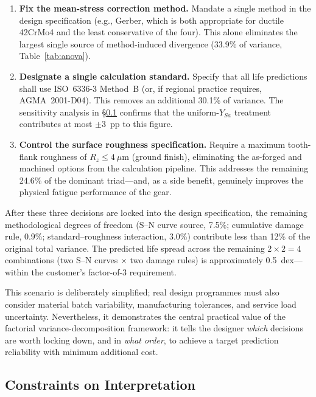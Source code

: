 \documentclass[12pt,a4paper]{article}
\begin{document}
\begin{enumerate}
  \item \textbf{Fix the mean-stress correction method.} Mandate a single
        method in the design specification (e.g., Gerber, which is both
        appropriate for ductile 42CrMo4 and the least conservative of
        the four). This alone eliminates the largest single source of
        method-induced divergence (33.9\% of variance, Table~\ref{tab:anova}).
  \item \textbf{Designate a single calculation standard.} Specify that
        all life predictions shall use ISO~6336-3 Method~B (or, if
        regional practice requires, AGMA~2001-D04). This removes an
        additional 30.1\% of variance. The sensitivity analysis in
        \S\ref{sec:constraints} confirms that the uniform-$Y_{Sa}$
        treatment contributes at most $\pm$3~pp to this figure.
  \item \textbf{Control the surface roughness specification.} Require a
        maximum tooth-flank roughness of $R_z \leq 4~\mu$m (ground
        finish), eliminating the as-forged and machined options from the
        calculation pipeline. This addresses the remaining 24.6\% of the
        dominant triad---and, as a side benefit, genuinely improves the
        physical fatigue performance of the gear.
\end{enumerate}

After these three decisions are locked into the design specification,
the remaining methodological degrees of freedom (S--N curve source,
7.5\%; cumulative damage rule, 0.9\%; standard--roughness interaction,
3.0\%) contribute less than 12\% of the original total variance. The
predicted life spread across the remaining $2 \times 2 = 4$
combinations (two S--N curves $\times$ two damage rules) is
approximately 0.5~dex---within the customer's factor-of-3 requirement.

This scenario is deliberately simplified; real design programmes must
also consider material batch variability, manufacturing tolerances, and
service load uncertainty. Nevertheless, it demonstrates the central
practical value of the factorial variance-decomposition framework: it
tells the designer \emph{which} decisions are worth locking down, and
in \emph{what order}, to achieve a target prediction reliability with
minimum additional cost.

\subsection{Constraints on Interpretation}
\label{sec:constraints}
\end{document}
